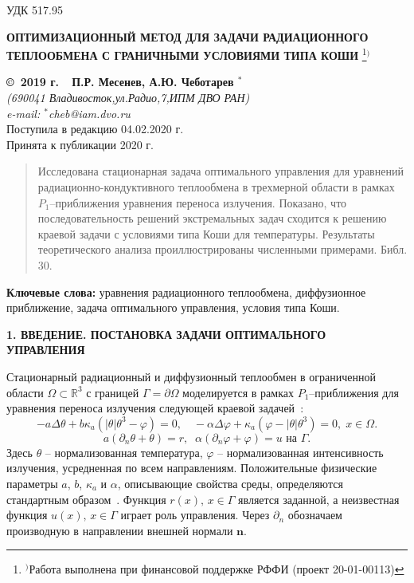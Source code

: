 \documentclass[12pt]{article}
\begin{document}
    УДК 517.95
    \begin{center}
    {\bf ОПТИМИЗАЦИОННЫЙ МЕТОД ДЛЯ ЗАДАЧИ РАДИАЦИОННОГО ТЕПЛООБМЕНА С ГРАНИЧНЫМИ УСЛОВИЯМИ ТИПА КОШИ}
        \footnote[{1}]{$^)$Работа выполнена при финансовой поддержке РФФИ (проект 20-01-00113)}$^)$
    \end{center}
    \begin{center}
    {\bf \copyright\  2019 г.\ \  П.Р. Месенев, А.Ю. Чеботарев $^{*}$}
        \\
        {\it (690041 Владивосток,ул.Радио,7,ИПМ ДВО РАН)\\
        e-mail:  $^{*}$cheb@iam.dvo.ru}\\
        {\small  Поступила в редакцию 04.02.2020 г.\\
        Принята к публикации 2020 г.}
    \end{center}

    \sloppy
    \begin{quote}
        \small
        Исследована стационарная задача оптимального управления для уравнений
        радиационно-кондуктивного теплообмена в трехмерной области в рамках $P_1$--приближения уравнения
        переноса излучения.
        Показано, что последовательность решений экстремальных задач
        сходится к решению краевой задачи с условиями типа Коши для температуры.
        Результаты теоретического анализа проиллюстрированы численными примерами.
        Библ. 30.
    \end{quote}
    {\bf Ключевые слова:} уравнения радиационного теплообмена, диффузионное
    приближение, задача оптимального управления, условия типа Коши.

    \begin{center}
        \textbf{1. ВВЕДЕНИЕ. ПОСТАНОВКА ЗАДАЧИ ОПТИМАЛЬНОГО УПРАВЛЕНИЯ}
    \end{center}

    Стационарный радиационный и диффузионный теплообмен в
    ограниченной области $\Omega\subset \mathbb{R}^3$ с границей
    $\Gamma=\partial\Omega$ моделируется в рамках $P_1$--приближения для уравнения
    переноса излучения следующей краевой задачей~\cite{Modest,Kovt}:
    \begin{equation}
        \label{eq1}
        - a\Delta\theta + b\kappa_a(|\theta|\theta^3- \varphi)=0,\quad
        -\alpha \Delta \varphi + \kappa_a(\varphi-|\theta|\theta^3)=0,\; x\in\Omega.
    \end{equation}
    \begin{equation}
        \label{bc1}
        a(\partial_n\theta+\theta) = r,\;\;
        \alpha(\partial_n\varphi+\varphi) = u \text{  на  }\Gamma.
    \end{equation}
    Здесь $\theta$ -- нормализованная температура, $\varphi$ --
    нормализованная интенсивность излучения, усредненная по всем направлениям.
    Положительные физические параметры $a$, $b$, $\kappa_a$ и $\alpha$, описывающие
    свойства среды, определяются стандартным образом~\cite{Kovt}.
    Функция $r(x),\, x\in\Gamma$ является заданной, а неизвестная функция $u(x),\, x\in\Gamma$
    играет роль управления.
    Через $\partial_n$ обозначаем производную в направлении
    внешней нормали $\mathbf n$.
\end{document}
